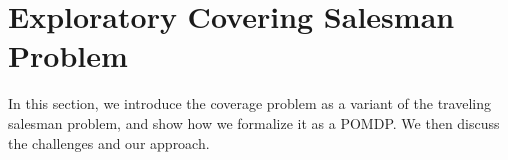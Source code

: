 \documentclass[letterpaper]{article} %
\begin{document}















\clearpage{}

\section{Exploratory Covering Salesman Problem}
\label{sec:ECSPasPOMDP}
In this section, we introduce the coverage problem as a variant of the traveling salesman problem, and show how we formalize it as a POMDP. We then discuss the challenges and our approach. %
\end{document}
